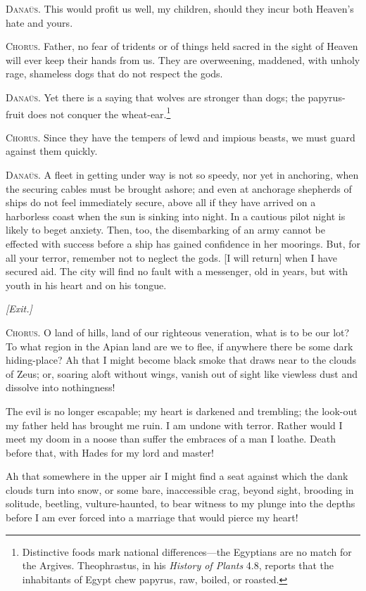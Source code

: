 \documentclass[12pt]{article}
\begin{document}
\textsc{Dana\"{u}s.} This would profit us well, my children, should they incur both Heaven's hate and yours.

\textsc{Chorus.} Father, no fear of tridents or of things held sacred in the sight of Heaven will ever keep their hands from us. They are overweening, maddened, with unholy rage, shameless dogs that do not respect the gods.

\textsc{Dana\"{u}s.} Yet there is a saying that wolves are stronger than dogs; the papyrus-fruit does not conquer the wheat-ear.\footnote{Distinctive foods mark national differences---the Egyptians are no match for the Argives. Theophrastus, in his \textit{History of Plants} 4.8, reports that the inhabitants of Egypt chew papyrus, raw, boiled, or roasted.}

\textsc{Chorus.} Since they have the tempers of lewd and impious beasts, we must guard against them quickly.

\textsc{Dana\"{u}s.} A fleet in getting under way is not so speedy, nor yet in anchoring, when the securing cables must be brought ashore; and even at anchorage shepherds of ships do not feel immediately secure, above all if they have arrived on a harborless coast when the sun is sinking into night. In a cautious pilot night is likely to beget anxiety. Then, too, the disembarking of an army cannot be effected with success before a ship has gained confidence in her moorings. But, for all your terror, remember not to neglect the gods. [I will return] when I have secured aid. The city will find no fault with a messenger, old in years, but with youth in his heart and on his tongue.

\begin{center}
\textit{[Exit.]}
\end{center}

\textsc{Chorus.} O land of hills, land of our righteous veneration, what is to be our lot? To what region in the Apian land are we to flee, if anywhere there be some dark hiding-place? Ah that I might become black smoke that draws near to the clouds of Zeus; or, soaring aloft without wings, vanish out of sight like viewless dust and dissolve into nothingness!

The evil is no longer escapable; my heart is darkened and trembling; the look-out my father held has brought me ruin. I am undone with terror. Rather would I meet my doom in a noose than suffer the embraces of a man I loathe. Death before that, with Hades for my lord and master!

Ah that somewhere in the upper air I might find a seat against which the dank clouds turn into snow, or some bare, inaccessible crag, beyond sight, brooding in solitude, beetling, vulture-haunted, to bear witness to my plunge into the depths before I am ever forced into a marriage that would pierce my heart!
\end{document}
